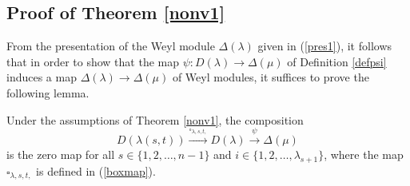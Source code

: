 \documentclass[ALCO,Unicode]{cedram}
\newcommand{\la}{\lambda}
\numberwithin{equation}{section}
\begin{document}
\subsection{Proof of Theorem \ref{nonv1}}\label{s5.2}
From the presentation of the Weyl module $\Delta(\lambda)$ given in (\ref{pres1}), it follows that in order to show that the map $\psi : D(\lambda) \to \Delta(\mu)$ of Definition \ref{defpsi} induces a map $\Delta(\lambda) \to \Delta(\mu)$ of Weyl modules, it suffices to prove the following lemma.
	\begin{lemma}\label{nonvlemma}
		Under the assumptions of Theorem \ref{nonv1}, the composition \[ D(\la(s,t)) \xrightarrow{\square_{\lambda,s,t,}}D(\lambda) \xrightarrow{\psi} \Delta(\mu) \]
		is the zero map for all $s \in \{1, 2, \dots, n-1\}$ and $i \in \{1, 2, \dots, \lambda_{s+1}\}$, where the map $\square_{\lambda,s,t,}$ is defined in (\ref{boxmap}).
	\end{lemma}
\end{document}
